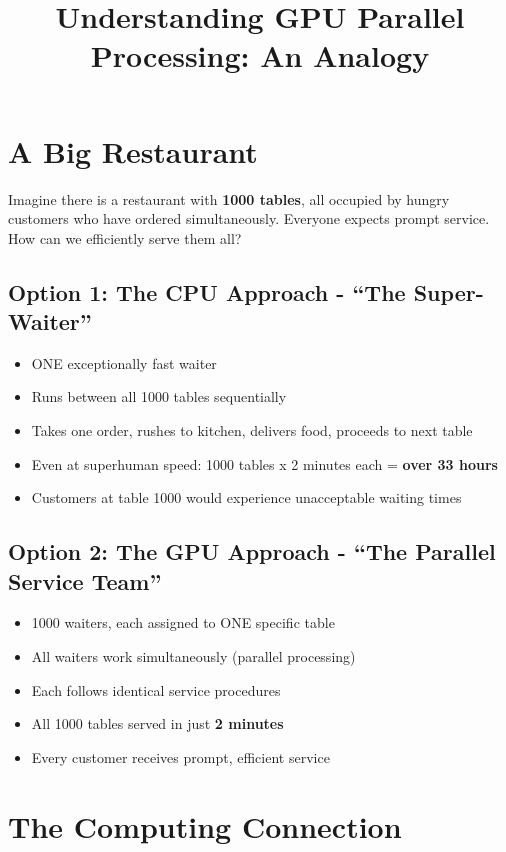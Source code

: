 \documentclass[11pt, a4paper]{article}
\title{Understanding GPU Parallel Processing: An Analogy}
\author{}
\date{}
\begin{document}
\maketitle

\section*{A Big Restaurant}

Imagine there is a restaurant with \textbf{1000 tables}, all occupied
by hungry customers who have ordered simultaneously. Everyone expects prompt
service. How can we efficiently serve them all?

\subsection*{Option 1: The CPU Approach - \enquote{The Super-Waiter}}
\begin{itemize}
    \item ONE exceptionally fast waiter
    \item Runs between all 1000 tables sequentially
    \item Takes one order, rushes to kitchen, delivers food, proceeds to next table
    \item Even at superhuman speed: 1000 tables x 2 minutes each = \textbf{over 33 hours}
    \item Customers at table 1000 would experience unacceptable waiting times
\end{itemize}

\subsection*{Option 2: The GPU Approach - \enquote{The Parallel Service Team}}
\begin{itemize}
    \item 1000 waiters, each assigned to ONE specific table
    \item All waiters work simultaneously (parallel processing)
    \item Each follows identical service procedures
    \item All 1000 tables served in just \textbf{2 minutes}
    \item Every customer receives prompt, efficient service
\end{itemize}

\section*{The Computing Connection}
\end{document}
